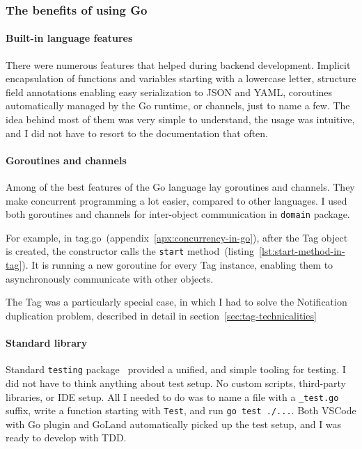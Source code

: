 \subsubsection{The benefits of using Go}\label{sec:the-benefits-of-using-go}

\paragraph{Built-in language features}\label{sec:built-in-language-features}

There were numerous features
that helped during backend development.
Implicit encapsulation of functions and variables
starting with a lowercase letter,
structure field annotations
enabling easy serialization
to \ac{JSON} and \ac{YAML},
coroutines automatically managed by the Go runtime,
or channels,
just to name a few.
The idea behind most of them
was very simple to understand,
the usage was intuitive,
and I did not have to resort to the documentation that often.

\paragraph{Goroutines and channels}\label{sec:goroutines-and-channels}

Among of the best features of the Go language lay goroutines and channels.
They make concurrent programming a lot easier, compared to other languages.
I used both goroutines and channels
for inter-object communication in \texttt{domain} package.

For example, in {tag.go}~(appendix~\ref{apx:concurrency-in-go}),
after the Tag object is created,
the constructor calls
the \texttt{start} method~(listing~\ref{lst:start-method-in-tag}).
It is running a new goroutine for every Tag instance,
enabling them to asynchronously communicate with other objects.

The Tag was a particularly special case,
in which I had to solve
the Notification duplication problem,
described in detail in section~\ref{sec:tag-technicalities}

\paragraph{Standard library}\label{sec:standard-library}

Standard \texttt{testing} package~\cite{cox_testing_2022} provided
a unified, and simple tooling for testing.
I did not have to think anything about test setup.
No custom scripts, third-party libraries, or \ac{IDE} setup.
All I needed to do was to name a file with a \texttt{\_test.go} suffix,
write a function starting with \texttt{Test},
and run \texttt{go\ test\ ./...}.
Both \ac{VSCode} with Go plugin and GoLand
automatically picked up the test setup,
and I was ready to develop with \ac{TDD}.

